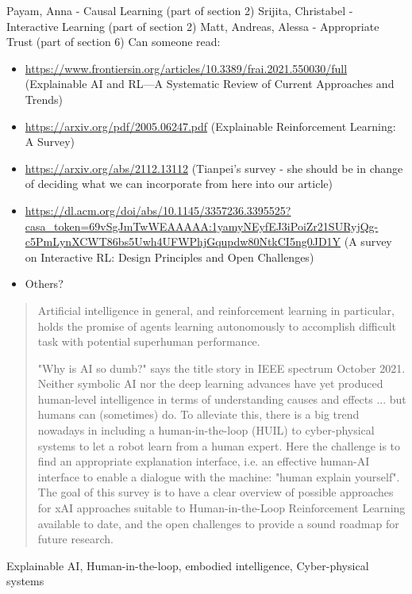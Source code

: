\documentclass[twoside,11pt]{article}
\begin{document}

Payam, Anna - Causal Learning (part of section 2)
Srijita, Christabel - Interactive Learning (part of section 2)
Matt, Andreas, Alessa - Appropriate Trust (part of section 6)
Can someone read: 
\begin{itemize}
\item \url{https://www.frontiersin.org/articles/10.3389/frai.2021.550030/full} (Explainable AI and RL—A Systematic Review of Current Approaches and Trends)
\item \url{https://arxiv.org/pdf/2005.06247.pdf} (Explainable Reinforcement Learning: A Survey)
\item \url{https://arxiv.org/abs/2112.13112} (Tianpei's survey - she should be in change of deciding what we can incorporate from here into our article)
\item \url{https://dl.acm.org/doi/abs/10.1145/3357236.3395525?casa_token=69vSgJmTwWEAAAAA:1yamyNEyfEJ3iPoiZr21SURyjQg-c5PmLynXCWT86bs5Uwh4UFWPhjGqupdw80NtkCI5ng0JD1Y} (A survey on Interactive RL: Design Principles and Open Challenges)
\item Others?
\end{itemize}

\newpage

\begin{abstract}%
Artificial intelligence in general, and reinforcement learning in particular, holds the promise of agents learning autonomously to accomplish difficult task with potential superhuman performance.


"Why is AI so dumb?" says the title story in IEEE spectrum October 2021. Neither symbolic AI nor the deep learning advances have yet produced human-level intelligence in terms of understanding causes and effects ... but humans can (sometimes) do. To alleviate this, there is a big trend nowadays in including a human-in-the-loop (HUIL) to cyber-physical systems to let a robot learn from a human expert. Here the challenge is to find an appropriate explanation interface, i.e. an effective human-AI interface to enable a dialogue with the machine: "human explain yourself".  The goal of this survey is to have a clear overview of possible approaches for xAI approaches suitable to Human-in-the-Loop Reinforcement Learning available to date, and the open challenges to provide a sound roadmap for future research.
\end{abstract}


\begin{keywords}
Explainable AI, Human-in-the-loop, embodied intelligence, Cyber-physical systems
\end{keywords}
\end{document}
